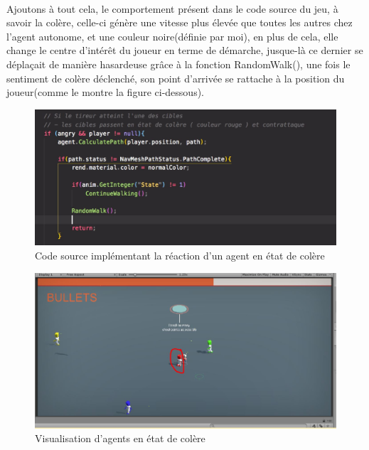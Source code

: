 ~\par
Ajoutons à tout cela, le comportement présent dans le code source du jeu, à savoir la colère, celle-ci génère une vitesse plus élevée que toutes les autres chez l’agent autonome, et une couleur noire(définie par moi), en plus de cela, elle change le centre d'intérêt du joueur en terme de démarche, jusque-là ce dernier se déplaçait de manière hasardeuse grâce à la fonction RandomWalk(), une fois le sentiment de colère déclenché, son point d’arrivée se rattache à la position du joueur(comme le montre la figure ci-dessous).



\begin{figure}[th]
\centering
\includegraphics{Figures/derfon.JPG}
\decoRule
\caption[Code source implémentant la réaction d'un agent en état de colère]{Code source implémentant la réaction d'un agent en état de colère}
\label{fig:bichi}
\end{figure}



\begin{figure}[th]
\centering
\includegraphics{Figures/rouge.JPG}
\decoRule
\caption[Visualisation d'agents en état de colère]{Visualisation d'agents en état de colère}
\label{fig:bichi}
\end{figure}


